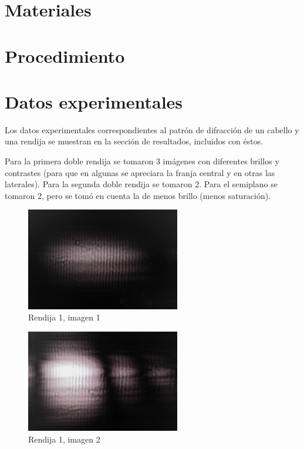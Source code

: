 \documentclass[12p]{article}
\begin{document}
\section{Materiales}

\section{Procedimiento}

\section{Datos experimentales}

Los datos experimentales correspondientes al patrón de difracción de un cabello y una rendija se muestran en la sección de resultados, incluidos con éstos.

Para la primera doble rendija se tomaron 3 imágenes con diferentes brillos y contrastes (para que en algunas se apreciara la franja central y en otras las laterales). Para la segunda doble rendija se tomaron 2. Para el semiplano se tomaron 2, pero se tomó en cuenta la de menos brillo (menos saturación).

\begin{figure}[h]
  \includegraphics[width=0.6\textwidth]{1.png}
  \centering
  \caption{Rendija 1, imagen 1}
\end{figure} 

\begin{figure}[h]
  \includegraphics[width=0.6\textwidth]{2.png}
  \centering
  \caption{Rendija 1, imagen 2}
\end{figure} 
\end{document}
